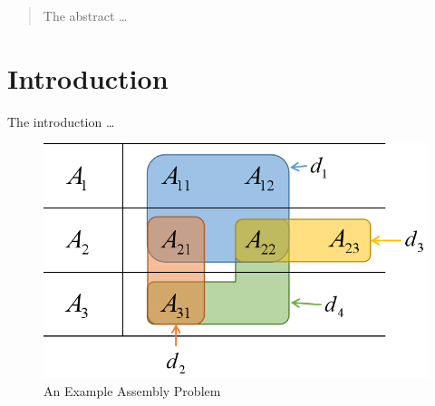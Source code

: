 \documentclass[sigplan,10pt,review]{acmart}\settopmatter{printfolios=true,printccs=false,printacmref=false}
\begin{document}
\begin{abstract}
  The abstract \dots
\end{abstract}





\keywords{}  %


\maketitle

\section{Introduction}
\label{sec:intro}
The introduction \dots

\begin{figure}[h]
    \centering
    \includegraphics[width=0.75\linewidth]{fig/formulation_example.png}
    \caption{An Example Assembly Problem}
    \label{fig:assemble-example-venn}
\end{figure}
\end{document}
